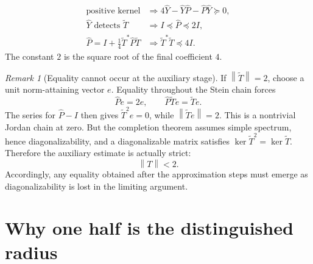 \documentclass[11pt,oneside,openany]{book}
\theoremstyle{definition}
\theoremstyle{remark}
\newtheorem{remark}[theorem]{Remark}
\newcommand{\norm}[1]{\left\lVert #1\right\rVert}
\begin{document}
\begin{checkpoint}
\[
\begin{aligned}
\text{positive kernel}
&\Longrightarrow
4\widehat Y-\widehat Y\widehat P-\widehat P\widehat Y\succeq0,\\
\widehat Y\text{ detects }\widetilde T
&\Longrightarrow I\preceq\widehat P\preceq2I,\\
\widehat P=I+\tfrac14\widetilde T^*\widehat P\widetilde T
&\Longrightarrow \widetilde T^*\widetilde T\preceq4I.
\end{aligned}
\]
The constant \(2\) is the square root of the final coefficient \(4\).
\end{checkpoint}

\begin{remark}[Equality cannot occur at the auxiliary stage]
\label{rem:auxiliary-strict}
If \(\norm{\widetilde T}=2\), choose a unit norm-attaining vector \(e\).
Equality throughout the Stein chain forces
\[
  \widehat Pe=2e,
  \qquad
  \widehat P\widetilde Te=\widetilde Te.
\]
The series for \(\widehat P-I\) then gives
\(\widetilde T^2e=0\), while
\(\norm{\widetilde Te}=2\).  This is a nontrivial Jordan chain at
zero.  But the completion theorem assumes simple spectrum, hence
diagonalizability, and a diagonalizable matrix satisfies
\(\ker\widetilde T^2=\ker\widetilde T\).  Therefore the auxiliary
estimate is actually strict:
\[
  \norm{T}<2.
\]
Accordingly, any equality obtained after the approximation steps must
emerge as diagonalizability is lost in the limiting argument.
\end{remark}

\section{Why one half is the distinguished radius}
\label{sec:general-radius}
\end{document}
